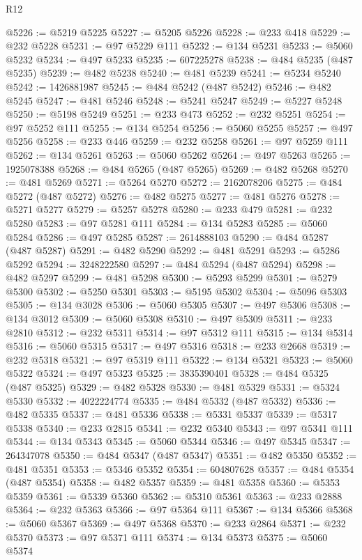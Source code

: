 \begin{lexlean}{R12}
\begin{coremodule}
@5226 := @5219 @5225
@5227 := @5205 @5226
@5228 := @233 @418
@5229 := @232 @5228
@5231 := @97 @5229 @111
@5232 := @134 @5231
@5233 := @5060 @5232
@5234 := @497 @5233
@5235 := 607225278
@5238 := @484 @5235 (@487 @5235)
@5239 := @482 @5238
@5240 := @481 @5239
@5241 := @5234 @5240
@5242 := 1426881987
@5245 := @484 @5242 (@487 @5242)
@5246 := @482 @5245
@5247 := @481 @5246
@5248 := @5241 @5247
@5249 := @5227 @5248
@5250 := @5198 @5249
@5251 := @233 @473
@5252 := @232 @5251
@5254 := @97 @5252 @111
@5255 := @134 @5254
@5256 := @5060 @5255
@5257 := @497 @5256
@5258 := @233 @446
@5259 := @232 @5258
@5261 := @97 @5259 @111
@5262 := @134 @5261
@5263 := @5060 @5262
@5264 := @497 @5263
@5265 := 1925078388
@5268 := @484 @5265 (@487 @5265)
@5269 := @482 @5268
@5270 := @481 @5269
@5271 := @5264 @5270
@5272 := 2162078206
@5275 := @484 @5272 (@487 @5272)
@5276 := @482 @5275
@5277 := @481 @5276
@5278 := @5271 @5277
@5279 := @5257 @5278
@5280 := @233 @479
@5281 := @232 @5280
@5283 := @97 @5281 @111
@5284 := @134 @5283
@5285 := @5060 @5284
@5286 := @497 @5285
@5287 := 2614888103
@5290 := @484 @5287 (@487 @5287)
@5291 := @482 @5290
@5292 := @481 @5291
@5293 := @5286 @5292
@5294 := 3248222580
@5297 := @484 @5294 (@487 @5294)
@5298 := @482 @5297
@5299 := @481 @5298
@5300 := @5293 @5299
@5301 := @5279 @5300
@5302 := @5250 @5301
@5303 := @5195 @5302
@5304 := @5096 @5303
@5305 := @134 @3028
@5306 := @5060 @5305
@5307 := @497 @5306
@5308 := @134 @3012
@5309 := @5060 @5308
@5310 := @497 @5309
@5311 := @233 @2810
@5312 := @232 @5311
@5314 := @97 @5312 @111
@5315 := @134 @5314
@5316 := @5060 @5315
@5317 := @497 @5316
@5318 := @233 @2668
@5319 := @232 @5318
@5321 := @97 @5319 @111
@5322 := @134 @5321
@5323 := @5060 @5322
@5324 := @497 @5323
@5325 := 3835390401
@5328 := @484 @5325 (@487 @5325)
@5329 := @482 @5328
@5330 := @481 @5329
@5331 := @5324 @5330
@5332 := 4022224774
@5335 := @484 @5332 (@487 @5332)
@5336 := @482 @5335
@5337 := @481 @5336
@5338 := @5331 @5337
@5339 := @5317 @5338
@5340 := @233 @2815
@5341 := @232 @5340
@5343 := @97 @5341 @111
@5344 := @134 @5343
@5345 := @5060 @5344
@5346 := @497 @5345
@5347 := 264347078
@5350 := @484 @5347 (@487 @5347)
@5351 := @482 @5350
@5352 := @481 @5351
@5353 := @5346 @5352
@5354 := 604807628
@5357 := @484 @5354 (@487 @5354)
@5358 := @482 @5357
@5359 := @481 @5358
@5360 := @5353 @5359
@5361 := @5339 @5360
@5362 := @5310 @5361
@5363 := @233 @2888
@5364 := @232 @5363
@5366 := @97 @5364 @111
@5367 := @134 @5366
@5368 := @5060 @5367
@5369 := @497 @5368
@5370 := @233 @2864
@5371 := @232 @5370
@5373 := @97 @5371 @111
@5374 := @134 @5373
@5375 := @5060 @5374

\end{coremodule}
\end{lexlean}
